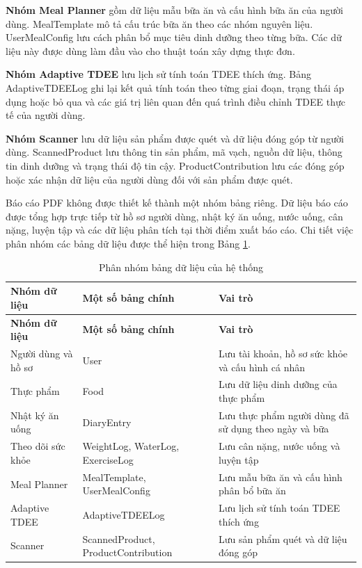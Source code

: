 \documentclass[12pt, a4paper]{report}
\begin{document}
\textbf{Nhóm Meal Planner} gồm dữ liệu mẫu bữa ăn và cấu hình bữa ăn của người dùng. MealTemplate mô tả cấu trúc bữa ăn theo các nhóm nguyên liệu. UserMealConfig lưu cách phân bổ mục tiêu dinh dưỡng theo từng bữa. Các dữ liệu này được dùng làm đầu vào cho thuật toán xây dựng thực đơn.

\textbf{Nhóm Adaptive TDEE} lưu lịch sử tính toán TDEE thích ứng. Bảng AdaptiveTDEELog ghi lại kết quả tính toán theo từng giai đoạn, trạng thái áp dụng hoặc bỏ qua và các giá trị liên quan đến quá trình điều chỉnh TDEE thực tế của người dùng.

\textbf{Nhóm Scanner} lưu dữ liệu sản phẩm được quét và dữ liệu đóng góp từ người dùng. ScannedProduct lưu thông tin sản phẩm, mã vạch, nguồn dữ liệu, thông tin dinh dưỡng và trạng thái độ tin cậy. ProductContribution lưu các đóng góp hoặc xác nhận dữ liệu của người dùng đối với sản phẩm được quét.

Báo cáo PDF không được thiết kế thành một nhóm bảng riêng. Dữ liệu báo cáo được tổng hợp trực tiếp từ hồ sơ người dùng, nhật ký ăn uống, nước uống, cân nặng, luyện tập và các dữ liệu phân tích tại thời điểm xuất báo cáo. Chi tiết việc phân nhóm các bảng dữ liệu được thể hiện trong Bảng \ref{tab:phan_nhom_bang}.

\begin{longtable}{|>{\raggedright\arraybackslash}p{4cm}|>{\raggedright\arraybackslash}p{4cm}|p{7cm}|}
\caption{Phân nhóm bảng dữ liệu của hệ thống}
\label{tab:phan_nhom_bang} \\
\hline
\textbf{Nhóm dữ liệu} & \textbf{Một số bảng chính} & \textbf{Vai trò} \\
\hline
\endfirsthead
\hline
\textbf{Nhóm dữ liệu} & \textbf{Một số bảng chính} & \textbf{Vai trò} \\
\hline
\endhead

Người dùng và hồ sơ & User & Lưu tài khoản, hồ sơ sức khỏe và cấu hình cá nhân \\
\hline
Thực phẩm & Food & Lưu dữ liệu dinh dưỡng của thực phẩm \\
\hline
Nhật ký ăn uống & DiaryEntry & Lưu thực phẩm người dùng đã sử dụng theo ngày và bữa \\
\hline
Theo dõi sức khỏe & WeightLog, WaterLog, ExerciseLog & Lưu cân nặng, nước uống và luyện tập \\
\hline
Meal Planner & MealTemplate, UserMealConfig & Lưu mẫu bữa ăn và cấu hình phân bổ bữa ăn \\
\hline
Adaptive TDEE & AdaptiveTDEELog & Lưu lịch sử tính toán TDEE thích ứng \\
\hline
Scanner & ScannedProduct, ProductContribution & Lưu sản phẩm quét và dữ liệu đóng góp \\
\hline
\end{longtable}
\end{document}
